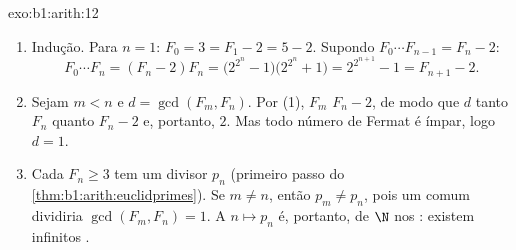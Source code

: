 \begin{solution}{exo:b1:arith:12}
\begin{enumerate}
  \item Indução. Para $n = 1$: $F_0 = 3 = F_1 - 2 = 5 - 2$.
        Supondo $F_0\cdots F_{n-1} = F_n - 2$:
        \[
        F_0 \cdots F_n = (F_n - 2)F_n
        = \bigl(2^{2^n} - 1\bigr)\bigl(2^{2^n} + 1\bigr)
        = 2^{2^{n+1}} - 1 = F_{n+1} - 2 .
        \]
  \item Sejam $m < n$ e $d = \gcd(F_m, F_n)$. Por (1), $F_m$
         $F_n - 2$, de modo que $d$  tanto $F_n$ quanto $F_n -
        2$ e, portanto,  $2$. Mas todo número de Fermat é ímpar,
        logo $d = 1$.
  \item Cada $F_n \geq 3$ tem um divisor  $p_n$
        (primeiro passo do \cref{thm:b1:arith:euclidprimes}). Se $m
        \neq n$, então $p_m \neq p_n$, pois um  comum
        dividiria $\gcd(F_m, F_n) = 1$. A  $n \mapsto p_n$ é,
        portanto,  de $\N$ nos : existem
        infinitos .
\end{enumerate}
\end{solution}

